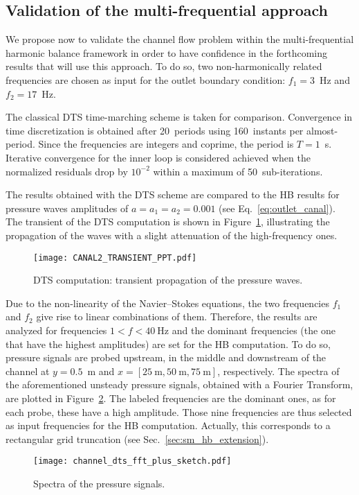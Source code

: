 \subsection{Validation of the multi-frequential approach}
\label{sec:channel_multifreq}

We propose
now to validate the channel flow problem within 
the multi-frequential harmonic balance framework
in order to have confidence in the forthcoming results that
will use this approach.
To do so, two non-harmonically related
frequencies are chosen as input for the outlet boundary condition:
$f_1 = 3$~Hz and $f_2 = 17$~Hz.

The classical DTS time-marching scheme is taken for comparison.
Convergence in time discretization is obtained after 20~periods using
160~instants per almost-period. Since the frequencies are integers and
coprime, the period is $T=1$~s.  Iterative convergence for the
inner loop is considered achieved when the normalized residuals drop
by $10^{-2}$ within a maximum of 50~sub-iterations.

The results obtained with the DTS scheme are compared to the HB
results for pressure waves amplitudes of $a = a_1 = a_2 = 0.001$
(see Eq.~\eqref{eq:outlet_canal}). The
transient of the DTS computation is shown in
Figure~\ref{fig:canal2_transient}, illustrating the propagation of the waves
with a slight attenuation of the high-frequency ones.
\begin{figure}[htp]
  \centering
  \texttt{[image: CANAL2\_TRANSIENT\_PPT.pdf]}
  \caption{DTS computation: transient propagation of the pressure waves.}
  \label{fig:canal2_transient}
\end{figure}

Due to the non-linearity of the Navier--Stokes equations, the two frequencies
$f_1$ and $f_2$ give rise to linear combinations of them.
Therefore, the results are analyzed for frequencies $1<f< 40~\textrm{Hz}$ and the
dominant frequencies (the one that have the highest amplitudes) are
set for the HB computation.  To do so, pressure signals are probed
upstream, in the middle and downstream of the channel at
$y=0.5$~m and $x=[25~\textrm{m}, 50~\textrm{m}, 75~\textrm{m}]$,
respectively.  The spectra of the aforementioned unsteady pressure
signals, obtained with a Fourier Transform, are plotted in
Figure~\ref{fig:canal2_dts_fft}.  The labeled frequencies are the
dominant ones, as for each probe, these have a high amplitude. Those
nine frequencies are thus selected as input frequencies for the HB computation.
Actually, this corresponds to a rectangular grid truncation 
(see Sec.~\ref{sec:sm_hb_extension}).
\begin{figure}[htp]
  \centering
  \texttt{[image: channel\_dts\_fft\_plus\_sketch.pdf]}
  \caption{Spectra of the pressure signals.}
  \label{fig:canal2_dts_fft}
\end{figure}

